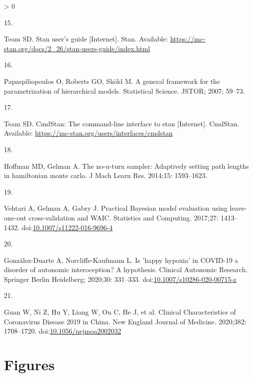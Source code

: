 \documentclass[10pt,letterpaper]{article}
\newlength{\csllabelwidth}
\newlength{\cslhangindent}
\newenvironment{CSLReferences}[3] %
 {%
  \setlength{\parindent}{0pt}
  \ifodd #1 \everypar{\setlength{\hangindent}{\cslhangindent}}\ignorespaces\fi
  \ifnum #2 > 0
  \setlength{\parskip}{#2\baselineskip}
  \fi
 }%
 {}
\newcommand{\CSLLeftMargin}[1]{\parbox[t]{\csllabelwidth}{#1}}
\newcommand{\CSLRightInline}[1]{\parbox[t]{\linewidth - \csllabelwidth}{#1}}
\begin{document}
\begin{CSLReferences}{0}{0}
\leavevmode\hypertarget{ref-stanmanual}{}%
\CSLLeftMargin{15. }
\CSLRightInline{Team SD. Stan user's guide {[}Internet{]}. Stan.
Available:
\url{https://mc-stan.org/docs/2_26/stan-users-guide/index.html}}

\leavevmode\hypertarget{ref-papaspiliopoulos2007general}{}%
\CSLLeftMargin{16. }
\CSLRightInline{Papaspiliopoulos O, Roberts GO, Sköld M. A general
framework for the parametrization of hierarchical models. Statistical
Science. JSTOR; 2007; 59--73. }

\leavevmode\hypertarget{ref-standevelopment}{}%
\CSLLeftMargin{17. }
\CSLRightInline{Team SD. CmdStan: The command-line interface to stan
{[}Internet{]}. CmdStan. Available:
\url{https://mc-stan.org/users/interfaces/cmdstan}}

\leavevmode\hypertarget{ref-hoffman2014no}{}%
\CSLLeftMargin{18. }
\CSLRightInline{Hoffman MD, Gelman A. The no-u-turn sampler: Adaptively
setting path lengths in hamiltonian monte carlo. J Mach Learn Res.
2014;15: 1593--1623. }

\leavevmode\hypertarget{ref-Vehtari2017}{}%
\CSLLeftMargin{19. }
\CSLRightInline{Vehtari A, Gelman A, Gabry J. {Practical Bayesian model
evaluation using leave-one-out cross-validation and WAIC}. Statistics
and Computing. 2017;27: 1413--1432.
doi:\href{https://doi.org/10.1007/s11222-016-9696-4}{10.1007/s11222-016-9696-4}}

\leavevmode\hypertarget{ref-Gonzalez-Duarte2020}{}%
\CSLLeftMargin{20. }
\CSLRightInline{González-Duarte A, Norcliffe-Kaufmann L. {Is 'happy
hypoxia' in COVID-19 a disorder of autonomic interoception? A
hypothesis}. Clinical Autonomic Research. Springer Berlin Heidelberg;
2020;30: 331--333.
doi:\href{https://doi.org/10.1007/s10286-020-00715-z}{10.1007/s10286-020-00715-z}}

\leavevmode\hypertarget{ref-Guan2020}{}%
\CSLLeftMargin{21. }
\CSLRightInline{Guan W, Ni Z, Hu Y, Liang W, Ou C, He J, et al.
{Clinical Characteristics of Coronavirus Disease 2019 in China}. New
England Journal of Medicine. 2020;382: 1708--1720.
doi:\href{https://doi.org/10.1056/nejmoa2002032}{10.1056/nejmoa2002032}}

\end{CSLReferences}

\newpage

\hypertarget{figures}{%
\section*{Figures}\label{figures}}

\nolinenumbers
\end{document}

